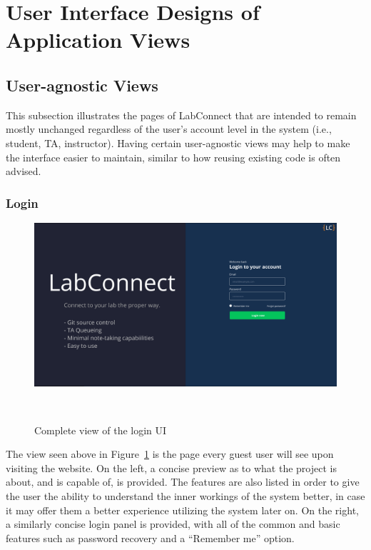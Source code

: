 \documentclass[a4paper, 12pt]{article}
\begin{document}
    \pagebreak

    \section{User Interface Designs of Application Views}

    \subsection{User-agnostic Views}

    This subsection illustrates the pages of LabConnect that are intended to remain mostly unchanged regardless of the user's account level in the system
    (i.e., student, TA, instructor). Having certain user-agnostic views may help to make the interface easier to maintain, similar to how
    reusing existing code is often advised.

    \subsubsection{Login}

    \begin{figure}[H]
        \centering
        \includegraphics[width=\textwidth]{login}
        \caption{Complete view of the login UI}~\label{fig:login_full}
    \end{figure}

    The view seen above in Figure~\ref{fig:login_full} is the page every guest user will see upon visiting the website.
    On the left, a concise preview as to what the project is about, and is capable of, is provided.
    The features are also listed in order to give the user the ability to understand the inner workings of the
    system better, in case it may offer them a better experience utilizing the system later on.
    On the right, a similarly concise login panel is provided, with all of the common and basic features
    such as password recovery and a ``Remember me'' option.
\end{document}
